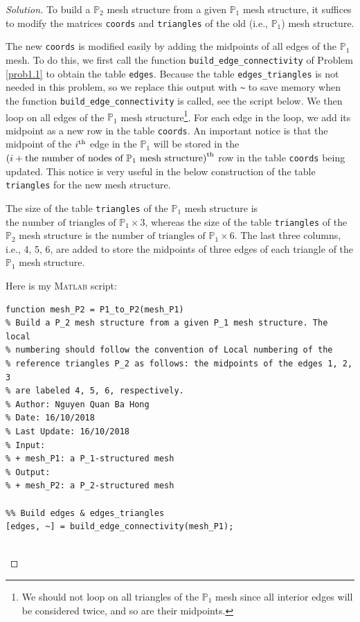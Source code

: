 \documentclass[11pt,a4paper,center,notitlepage]{article}
\numberwithin{equation}{section}
\begin{document}
\begin{proof}[Solution] 
To build a $\mathbb{P}_2$ mesh structure from a given $\mathbb{P}_1$ mesh structure, it suffices to modify the matrices \verb|coords| and \verb|triangles| of the old (i.e., $\mathbb{P}_1$) mesh structure.

The new \verb|coords| is modified easily by adding the midpoints of all edges of the $\mathbb{P}_1$ mesh. To do this, we first call the function \verb|build_edge_connectivity| of Problem \ref{prob1.1} to obtain the table \verb|edges|. Because the table \verb|edges_triangles| is not needed in this problem, so we replace this output with \verb|~| to save memory when the function \verb|build_edge_connectivity| is called, see the script below. We then loop on all edges of the $\mathbb{P}_1$ mesh structure\footnote{We should not loop on all triangles of the $\mathbb{P}_1$ mesh since all interior edges will be considered twice, and so are their midpoints.}. For each edge in the loop, we add its midpoint as a new row in the table \verb|coords|. An important notice is that the midpoint of the $i^{\rm th}$ edge in the $\mathbb{P}_1$ will be stored in the $\left(i+ \mbox{the number of nodes of }\mathbb{P}_1 \mbox{ mesh structure}\right)^{\rm th}$ row in the table \verb|coords| being updated. This notice is very useful in the below construction of the table \verb|triangles| for the new mesh structure.

The size of the table \verb|triangles| of the $\mathbb{P}_1$ mesh structure is $\mbox{the number of triangles of }\mathbb{P}_1 \times 3$, whereas the size of the table \verb|triangles| of the $\mathbb{P}_2$ mesh structure is $\mbox{the number of triangles of }\mathbb{P}_1 \times 6$. The last three columns, i.e., 4, 5, 6, are added to store the midpoints of three edges of each triangle of the $\mathbb{P}_1$ mesh structure.

Here is my \textsc{Matlab} script:
\begin{verbatim}
function mesh_P2 = P1_to_P2(mesh_P1)
% Build a P_2 mesh structure from a given P_1 mesh structure. The local
% numbering should follow the convention of Local numbering of the
% reference triangles P_2 as follows: the midpoints of the edges 1, 2, 3
% are labeled 4, 5, 6, respectively.
% Author: Nguyen Quan Ba Hong
% Date: 16/10/2018
% Last Update: 16/10/2018
% Input:
% + mesh_P1: a P_1-structured mesh
% Output:
% + mesh_P2: a P_2-structured mesh

%% Build edges & edges_triangles
[edges, ~] = build_edge_connectivity(mesh_P1);


\end{verbatim}
\end{proof}
\end{document}
